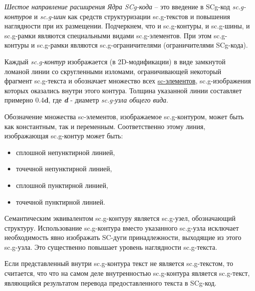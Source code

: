 \begin{SCn}
\end{SCn}
	
\textit{Шестое направление расширения Ядра SCg-кода} -- это введение в SCg-код \textit{sc.g-контуров} и \textit{sc.g-шин} как средств структуризации sc.g-текстов и повышения наглядности при их размещении. Подчеркнем, что и sc.g-контуры, и sc.g-шины, и sc.g-рамки являются специальными видами sc.g-элементов. При этом sc.g-контуры и sc.g-рамки являются sc.g-ограничителями (ограничителями SCg-кода).

\begin{SCn}
\end{SCn}

Каждый \textit{sc.g-контур} изображается (в 2D-модификации) в виде замкнутой ломаной линии со скругленными изломами, ограничивающей некоторый фрагмент sc.g-текста и обозначает множество всех \uline{sc-элементов}, sc.g-изображения которых оказались внутри этого контура. Толщина указанной линии составляет примерно $\bm{0.4d}$, где \textbf{\textit{d}} - диаметр \textit{sc.g-узла общего вида}.

Обозначение множества sc-элементов, изображаемое sc.g-контуром, может быть как константным, так и переменным. Соответственно этому линия, изображающая sc.g-контур может быть: 

\begin{itemize}
	\item сплошной непунктирной линией,
	\item точечной непунктирной линией,
	\item сплошной пунктирной линией,
	\item точечной пунктирной линией.
\end{itemize}

\bigskip
Семантическим эквивалентом sc.g-контуру является sc.g-узел, обозначающий структуру. Использование sc.g-контура вместо указанного sc.g-узла исключает необходимость явно изображать SC-дуги принадлежности, выходящие из этого sc.g-узла. Это существенно повышает уровень наглядности sc.g-текста.

Если представленный внутри sc.g-контура текст не является sc.g-текстом, то считается, что что на самом деле внутренностью sc.g-контура является sc.g-текст, являющийся результатом перевода предоставленного текста в SCg-код.

\begin{SCn}
\end{SCn}

